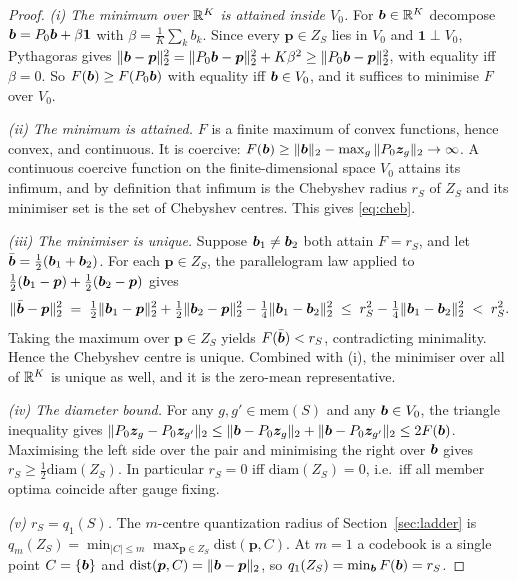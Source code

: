 \begin{proof}
\emph{(i) The minimum over $\mathbb{R}^{K}$ is attained inside $V_0$.}
For $\bm{b}\in\mathbb{R}^{K}$ decompose $\bm{b} = P_0\bm{b} + \beta\mathbf{1}$ with
$\beta=\frac1K\sum_k b_k$. Since every $\bm{p}\in Z_S$ lies in $V_0$ and
$\mathbf{1}\perp V_0$, Pythagoras gives
$\|\bm{b}-\bm{p}\|_2^2 = \|P_0\bm{b}-\bm{p}\|_2^2 + K\beta^2 \ge \|P_0\bm{b}-\bm{p}\|_2^2$,
with equality iff $\beta=0$. So $F(\bm{b})\ge F(P_0\bm{b})$ with equality iff
$\bm{b}\in V_0$, and it suffices to minimise $F$ over $V_0$.

\emph{(ii) The minimum is attained.}
$F$ is a finite maximum of convex functions, hence convex, and continuous. It is
coercive: $F(\bm{b})\ge\|\bm{b}\|_2-\max_g\|P_0\bm{z}_g\|_2\to\infty$. A continuous coercive
function on the finite-dimensional space $V_0$ attains its infimum, and by
definition that infimum is the Chebyshev radius $r_S$ of $Z_S$ and its minimiser
set is the set of Chebyshev centres. This gives \eqref{eq:cheb}.

\emph{(iii) The minimiser is unique.}
Suppose $\bm{b}_1\neq\bm{b}_2$ both attain $F=r_S$, and let
$\bar{\bm{b}}=\tfrac12(\bm{b}_1+\bm{b}_2)$. For each $\bm{p}\in Z_S$, the parallelogram law
applied to $\tfrac12(\bm{b}_1-\bm{p})+\tfrac12(\bm{b}_2-\bm{p})$ gives
\begin{equation}
  \|\bar{\bm{b}}-\bm{p}\|_2^2
  \;=\;\tfrac12\|\bm{b}_1-\bm{p}\|_2^2+\tfrac12\|\bm{b}_2-\bm{p}\|_2^2
      -\tfrac14\|\bm{b}_1-\bm{b}_2\|_2^2
  \;\le\; r_S^2-\tfrac14\|\bm{b}_1-\bm{b}_2\|_2^2
  \;<\;r_S^2 .
  \label{eq:app-parallelogram}
\end{equation}
Taking the maximum over $\bm{p}\in Z_S$ yields $F(\bar{\bm{b}})<r_S$, contradicting
minimality. Hence the Chebyshev centre is unique. Combined with (i), the minimiser
over all of $\mathbb{R}^{K}$ is unique as well, and it is the zero-mean representative.

\emph{(iv) The diameter bound.}
For any $g,g'\in\mathrm{mem}(S)$ and any $\bm{b}\in V_0$, the triangle inequality gives
$\|P_0\bm{z}_g-P_0\bm{z}_{g'}\|_2\le\|\bm{b}-P_0\bm{z}_g\|_2+\|\bm{b}-P_0\bm{z}_{g'}\|_2\le 2F(\bm{b})$.
Maximising the left side over the pair and minimising the right over $\bm{b}$ gives
$r_S\ge\tfrac12\mathrm{diam}(Z_S)$. In particular $r_S=0$ iff
$\mathrm{diam}(Z_S)=0$, i.e.\ iff all member optima coincide after gauge fixing.

\emph{(v) $r_S=q_1(S)$.}
The $m$-centre quantization radius of Section~\ref{sec:ladder} is
$q_m(Z_S)=\min_{|C|\le m}\max_{\bm{p}\in Z_S}\mathrm{dist}(\bm{p},C)$. At $m=1$ a
codebook is a single point $C=\{\bm{b}\}$ and $\mathrm{dist}(\bm{p},C)=\|\bm{b}-\bm{p}\|_2$,
so $q_1(Z_S)=\min_{\bm{b}} F(\bm{b})=r_S$.
\end{proof}

